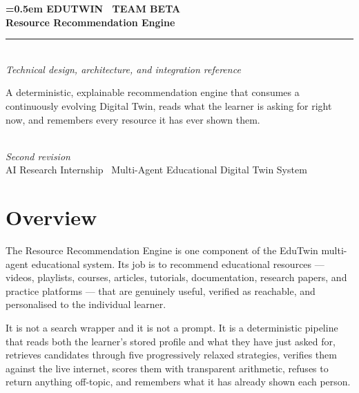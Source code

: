 \documentclass[11pt,a4paper]{article}
\begin{document}
\thispagestyle{empty}
\vspace*{5cm}
\begin{center}
{\small\color{slate}\bfseries\spaceskip=0.5em EDUTWIN \textperiodcentered\ TEAM BETA}\\[10pt]
{\Huge\bfseries\color{navy} Resource Recommendation Engine}\\[10pt]
{\color{rule}\rule{0.75\textwidth}{0.6pt}}\\[14pt]
{\large\itshape\color{slate} Technical design, architecture, and integration reference}\\[16pt]
\begin{minipage}{0.78\textwidth}
\centering\small
A deterministic, explainable recommendation engine that consumes a
continuously evolving Digital Twin, reads what the learner is asking for
right now, and remembers every resource it has ever shown them.
\end{minipage}\\[3.5cm]
{\small\itshape\color{slate} Second revision}\\[4pt]
{\small\color{slate} AI Research Internship \textperiodcentered\ Multi-Agent Educational Digital Twin System}
\end{center}
\newpage

\tableofcontents
\newpage

\section{Overview}

The Resource Recommendation Engine is one component of the EduTwin multi-agent
educational system. Its job is to recommend educational resources --- videos,
playlists, courses, articles, tutorials, documentation, research papers, and
practice platforms --- that are genuinely useful, verified as reachable, and
personalised to the individual learner.

It is not a search wrapper and it is not a prompt. It is a deterministic
pipeline that reads both the learner's stored profile and what they have just
asked for, retrieves candidates through five progressively relaxed strategies,
verifies them against the live internet, scores them with transparent
arithmetic, refuses to return anything off-topic, and remembers what it has
already shown each person.
\end{document}
